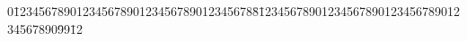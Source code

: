 


\author{}
\title{}

{\small
\begin{tabbing}
0\=12345678901234567890123456789012345678\=8\=1234567890123456789012345678901234567890\=99\=12\kill



\end{tabbing}
}


